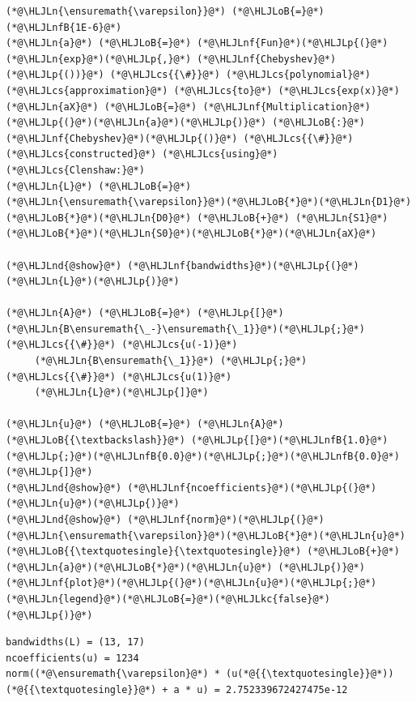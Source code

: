 \documentclass[12pt,a4paper]{article}
\newcommand{\HLJLkc}[1]{\textcolor[RGB]{59,151,46}{\textit{#1}}}
\newcommand{\HLJLn}[1]{#1}
\newcommand{\HLJLnd}[1]{\textcolor[RGB]{214,102,97}{#1}}
\newcommand{\HLJLnf}[1]{\textcolor[RGB]{66,102,213}{#1}}
\newcommand{\HLJLnfB}[1]{\textcolor[RGB]{59,151,46}{#1}}
\newcommand{\HLJLoB}[1]{\textcolor[RGB]{102,102,102}{\textbf{#1}}}
\newcommand{\HLJLp}[1]{#1}
\newcommand{\HLJLcs}[1]{\textcolor[RGB]{153,153,119}{\textit{#1}}}
\begin{document}
\begin{lstlisting}
(*@\HLJLn{\ensuremath{\varepsilon}}@*) (*@\HLJLoB{=}@*) (*@\HLJLnfB{1E-6}@*)
(*@\HLJLn{a}@*) (*@\HLJLoB{=}@*) (*@\HLJLnf{Fun}@*)(*@\HLJLp{(}@*)(*@\HLJLn{exp}@*)(*@\HLJLp{,}@*) (*@\HLJLnf{Chebyshev}@*)(*@\HLJLp{())}@*) (*@\HLJLcs{{\#}}@*) (*@\HLJLcs{polynomial}@*) (*@\HLJLcs{approximation}@*) (*@\HLJLcs{to}@*) (*@\HLJLcs{exp(x)}@*)
(*@\HLJLn{aX}@*) (*@\HLJLoB{=}@*) (*@\HLJLnf{Multiplication}@*)(*@\HLJLp{(}@*)(*@\HLJLn{a}@*)(*@\HLJLp{)}@*) (*@\HLJLoB{:}@*) (*@\HLJLnf{Chebyshev}@*)(*@\HLJLp{()}@*) (*@\HLJLcs{{\#}}@*) (*@\HLJLcs{constructed}@*) (*@\HLJLcs{using}@*) (*@\HLJLcs{Clenshaw:}@*)
(*@\HLJLn{L}@*) (*@\HLJLoB{=}@*) (*@\HLJLn{\ensuremath{\varepsilon}}@*)(*@\HLJLoB{*}@*)(*@\HLJLn{D1}@*)(*@\HLJLoB{*}@*)(*@\HLJLn{D0}@*) (*@\HLJLoB{+}@*) (*@\HLJLn{S1}@*)(*@\HLJLoB{*}@*)(*@\HLJLn{S0}@*)(*@\HLJLoB{*}@*)(*@\HLJLn{aX}@*)

(*@\HLJLnd{@show}@*) (*@\HLJLnf{bandwidths}@*)(*@\HLJLp{(}@*)(*@\HLJLn{L}@*)(*@\HLJLp{)}@*)

(*@\HLJLn{A}@*) (*@\HLJLoB{=}@*) (*@\HLJLp{[}@*)(*@\HLJLn{B\ensuremath{\_-}\ensuremath{\_1}}@*)(*@\HLJLp{;}@*)   (*@\HLJLcs{{\#}}@*) (*@\HLJLcs{u(-1)}@*)
     (*@\HLJLn{B\ensuremath{\_1}}@*) (*@\HLJLp{;}@*)   (*@\HLJLcs{{\#}}@*) (*@\HLJLcs{u(1)}@*)
     (*@\HLJLn{L}@*)(*@\HLJLp{]}@*) 

(*@\HLJLn{u}@*) (*@\HLJLoB{=}@*) (*@\HLJLn{A}@*) (*@\HLJLoB{{\textbackslash}}@*) (*@\HLJLp{[}@*)(*@\HLJLnfB{1.0}@*)(*@\HLJLp{;}@*)(*@\HLJLnfB{0.0}@*)(*@\HLJLp{;}@*)(*@\HLJLnfB{0.0}@*)(*@\HLJLp{]}@*)
(*@\HLJLnd{@show}@*) (*@\HLJLnf{ncoefficients}@*)(*@\HLJLp{(}@*)(*@\HLJLn{u}@*)(*@\HLJLp{)}@*)
(*@\HLJLnd{@show}@*) (*@\HLJLnf{norm}@*)(*@\HLJLp{(}@*)(*@\HLJLn{\ensuremath{\varepsilon}}@*)(*@\HLJLoB{*}@*)(*@\HLJLn{u}@*)(*@\HLJLoB{{\textquotesingle}{\textquotesingle}}@*) (*@\HLJLoB{+}@*) (*@\HLJLn{a}@*)(*@\HLJLoB{*}@*)(*@\HLJLn{u}@*) (*@\HLJLp{)}@*)
(*@\HLJLnf{plot}@*)(*@\HLJLp{(}@*)(*@\HLJLn{u}@*)(*@\HLJLp{;}@*) (*@\HLJLn{legend}@*)(*@\HLJLoB{=}@*)(*@\HLJLkc{false}@*)(*@\HLJLp{)}@*)
\end{lstlisting}

\begin{lstlisting}
bandwidths(L) = (13, 17)
ncoefficients(u) = 1234
norm((*@\ensuremath{\varepsilon}@*) * (u(*@{{\textquotesingle}}@*))(*@{{\textquotesingle}}@*) + a * u) = 2.752339672427475e-12
\end{lstlisting}
\end{document}
